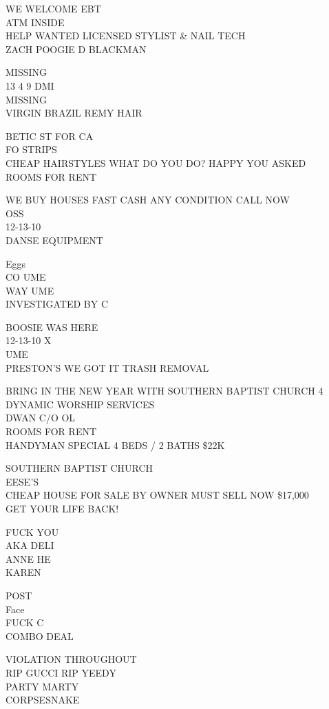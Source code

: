 \documentclass[10pt,letterpaper]{article}
\begin{document}
WE WELCOME EBT\\
ATM INSIDE\\
HELP WANTED LICENSED STYLIST \& NAIL TECH\\
ZACH POOGIE D BLACKMAN

MISSING\\
13 4 9 DMI\\
MISSING\\
VIRGIN BRAZIL REMY HAIR

BETIC ST FOR CA\\
FO STRIPS\\
CHEAP HAIRSTYLES WHAT DO YOU DO? HAPPY YOU ASKED\\
ROOMS FOR RENT

WE BUY HOUSES FAST CASH ANY CONDITION CALL NOW\\
OSS\\
12{-}13{-}10\\
DANSE EQUIPMENT

Eggs\\
CO UME\\
WAY UME\\
INVESTIGATED BY C

BOOSIE WAS HERE\\
12{-}13{-}10 X\\
UME\\
PRESTON'S WE GOT IT TRASH REMOVAL

BRING IN THE NEW YEAR WITH SOUTHERN BAPTIST CHURCH 4 DYNAMIC WORSHIP SERVICES\\
DWAN C/O OL\\
ROOMS FOR RENT\\
HANDYMAN SPECIAL 4 BEDS / 2 BATHS \$22K

SOUTHERN BAPTIST CHURCH\\
EESE'S\\
CHEAP HOUSE FOR SALE BY OWNER MUST SELL NOW \$17,000\\
GET YOUR LIFE BACK!

FUCK YOU\\
AKA DELI\\
ANNE HE\\
KAREN

POST\\
Face\\
FUCK C\\
COMBO DEAL

VIOLATION THROUGHOUT\\
RIP GUCCI RIP YEEDY\\
PARTY MARTY\\
CORPSESNAKE
\end{document}
